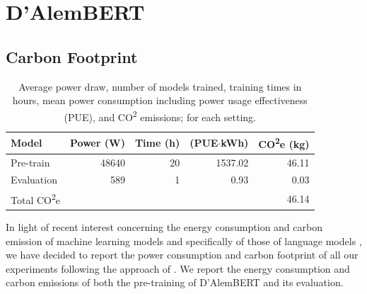 \chapter{D'AlemBERT}

\section{Carbon Footprint}\label{carbon-footprint-dalembert}

\begin{table}[th]
    \centering\small
    \begin{tabular}{lrrrr}
        \toprule
        \textbf{Model}               & {\textbf{Power (W)}} & {\textbf{Time (h)}} & {\textbf{(PUE$\cdotp$kWh)}} & {\textbf{CO\textsuperscript{2}e (kg)}} \\
        \midrule
        Pre-train                    & 48640                & 20                  & 1537.02                     & 46.11                                  \\
        Evaluation                   & 589                  & 1                   & 0.93                        & 0.03                                   \\
        \midrule
        Total CO\textsuperscript{2}e &                      &                     &                             & 46.14                                  \\
        \bottomrule
    \end{tabular}
    \caption{Average power draw, number of models trained, training times in hours, mean power consumption including power usage effectiveness (PUE), and CO\textsuperscript{2} emissions; for each setting.}
    \label{tab:carbon-dalembert}
\end{table}

In light of recent interest concerning the energy consumption and carbon emission of machine learning models and specifically of those of language models \cite{schwartz-etal-2020-green,bender-etal-2021-on}, we have decided to report the power consumption and carbon footprint of all our experiments following the approach of . We report the energy consumption and carbon emissions of both the pre-training of D'AlemBERT and its evaluation.

